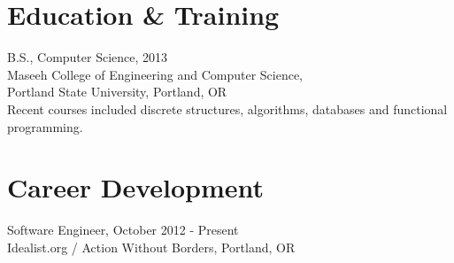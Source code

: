 \documentclass[10pt]{res} %
\begin{document}
 
 
\address{9128 SE Harrison St \\ Portland OR 97216 \\ (503) 703-5611 \\
			carrbens@gmail.com \\ github.com/carrbs}        
         
                        
\begin{resume}                         
 
   
\section{Education \& Training}
B.S., Computer Science, 2013\\ 
Maseeh College of Engineering and Computer Science, \\
Portland State University, Portland, OR \\
Recent courses included discrete structures, algorithms, databases and functional programming.

% 

\section{Career Development} \vspace{.05in}
Software Engineer, October 2012 - Present\\
Idealist.org / Action Without Borders, Portland, OR


\end{resume}
\end{document}
